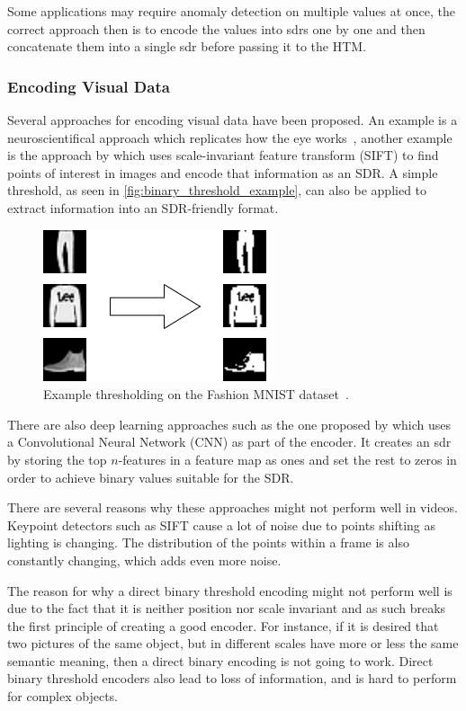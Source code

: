 Some applications may require anomaly detection on multiple values at once, the correct approach then is to encode the values into \glspl*{sdr} one by one and then concatenate them into a single \gls*{sdr} before passing it to the HTM.
\subsubsection{Encoding Visual Data}
Several approaches for encoding visual data have been proposed. An example is a neuroscientifical approach which replicates how the eye works~\cite{eyeencoder}, another example is the approach by \textcite{ObjectDetectionSIFT} which uses scale-invariant feature transform (SIFT) to find points of interest in images and encode that information as an SDR. A simple threshold, as seen in \autoref{fig:binary_threshold_example}, can also be applied to extract information into an SDR-friendly format.
\begin{figure}[H]
    \centering
    \includegraphics[width=0.5\linewidth]{resources/related_works/binary_threshold_example.png}
    \caption[Thresholding Example]{Example thresholding on the Fashion MNIST dataset~\cite{mnist_fashion}.}
    \label{fig:binary_threshold_example}
\end{figure}
\par
There are also deep learning approaches such as the one proposed by \textcite{CNN_HTM} which uses a Convolutional Neural Network (CNN) as part of the encoder. It creates an \gls*{sdr} by storing the top $n$-features in a feature map as ones and set the rest to zeros in order to achieve binary values suitable for the SDR.
\par
There are several reasons why these approaches might not perform well in videos. Keypoint detectors such as SIFT cause a lot of noise due to points shifting as lighting is changing. The distribution of the points within a frame is also constantly changing, which adds even more noise.
\par
The reason for why a direct binary threshold encoding might not perform well is due to the fact that it is neither position nor scale invariant and as such breaks the first principle of creating a good encoder. For instance, if it is desired that two pictures of the same object, but in different scales have more or less the same semantic meaning, then a direct binary encoding is not going to work. Direct binary threshold encoders also lead to loss of information, and is hard to perform for complex objects.
